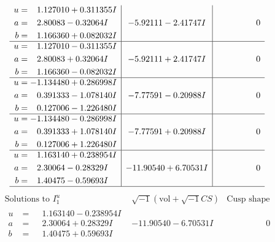 \documentclass[1p]{elsarticle_modified}
\theoremstyle{definition}
\newcommand{\I}{\sqrt{-1}}
\begin{document}
$$\begin{array}{c|c|c}
\begin{aligned}
u &= \phantom{-}1.127010 + 0.311355 I \\
a &= \phantom{-}2.80083 - 0.32064 I \\
b &= \phantom{-}1.166360 + 0.082032 I\end{aligned}
 & -5.92111 - 2.41747 I & \phantom{-0.000000 } 0 \\ \hline\begin{aligned}
u &= \phantom{-}1.127010 - 0.311355 I \\
a &= \phantom{-}2.80083 + 0.32064 I \\
b &= \phantom{-}1.166360 - 0.082032 I\end{aligned}
 & -5.92111 + 2.41747 I & \phantom{-0.000000 } 0 \\ \hline\begin{aligned}
u &= -1.134480 + 0.286998 I \\
a &= \phantom{-}0.391333 - 1.078140 I \\
b &= \phantom{-}0.127006 - 1.226480 I\end{aligned}
 & -7.77591 - 0.20988 I & \phantom{-0.000000 } 0 \\ \hline\begin{aligned}
u &= -1.134480 - 0.286998 I \\
a &= \phantom{-}0.391333 + 1.078140 I \\
b &= \phantom{-}0.127006 + 1.226480 I\end{aligned}
 & -7.77591 + 0.20988 I & \phantom{-0.000000 } 0 \\ \hline\begin{aligned}
u &= \phantom{-}1.163140 + 0.238954 I \\
a &= \phantom{-}2.30064 - 0.28329 I \\
b &= \phantom{-}1.40475 - 0.59693 I\end{aligned}
 & -11.90540 + 6.70531 I & \phantom{-0.000000 } 0\\
 \hline 
 \end{array}$$\newpage$$\begin{array}{c|c|c}  
\text{Solutions to }I^u_{1}& \I (\text{vol} + \sqrt{-1}CS) & \text{Cusp shape}\\
 \hline 
\begin{aligned}
u &= \phantom{-}1.163140 - 0.238954 I \\
a &= \phantom{-}2.30064 + 0.28329 I \\
b &= \phantom{-}1.40475 + 0.59693 I\end{aligned}
 & -11.90540 - 6.70531 I & \phantom{-0.000000 } 0 \\ \hline\begin{aligned}

\end{aligned}
\end{array}$$
\end{document}
